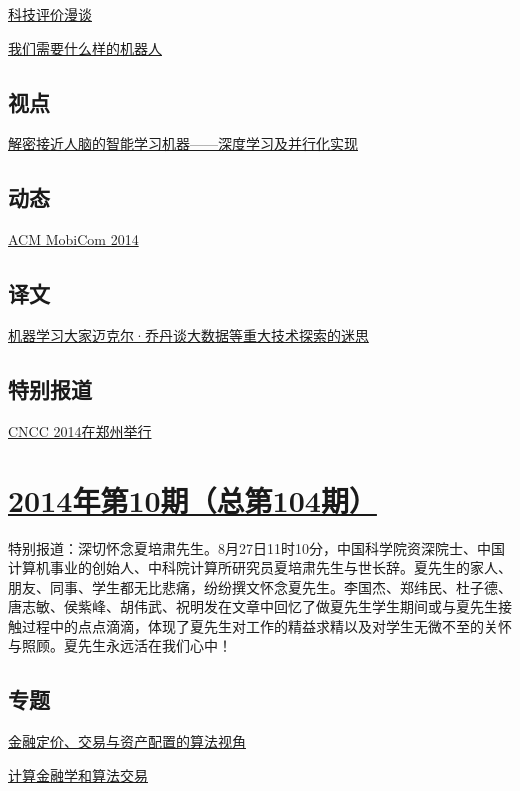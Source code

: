 \documentclass[a4paper]{article}
\begin{document}
\href{http://history.ccf.org.cn/resources/1190201776262/2014/11/13/6.pdf}{科技评价漫谈}

\href{http://history.ccf.org.cn/resources/1190201776262/2014/11/13/8.pdf}{我们需要什么样的机器人}

\subsection{视点}
\href{http://history.ccf.org.cn/resources/1190201776262/2014/11/13/12.pdf}{解密接近人脑的智能学习机器——深度学习及并行化实现}

\subsection{动态}
\href{http://history.ccf.org.cn/resources/1190201776262/2014/11/13/13.pdf}{ACM MobiCom 2014}

\subsection{译文}
\href{http://history.ccf.org.cn/resources/1190201776262/2014/11/13/14.pdf}{机器学习大家迈克尔·乔丹谈大数据等重大技术探索的迷思}

\subsection{特别报道}
\href{http://history.ccf.org.cn/resources/1190201776262/2014/11/13/0.pdf}{CNCC 2014在郑州举行}


\section{\href{http://history.ccf.org.cn/sites/ccf/jsjtbbd.jsp?contentId=2826288041117}{\textbf{2014年第10期（总第104期）}}}
特别报道：深切怀念夏培肃先生。8月27日11时10分，中国科学院资深院士、中国计算机事业的创始人、中科院计算所研究员夏培肃先生与世长辞。夏先生的家人、朋友、同事、学生都无比悲痛，纷纷撰文怀念夏先生。李国杰、郑纬民、杜子德、唐志敏、侯紫峰、胡伟武、祝明发在文章中回忆了做夏先生学生期间或与夏先生接触过程中的点点滴滴，体现了夏先生对工作的精益求精以及对学生无微不至的关怀与照顾。夏先生永远活在我们心中！
\subsection{专题}
\href{http://history.ccf.org.cn/resources/1190201776262/2014/10/13/13.pdf}{金融定价、交易与资产配置的算法视角}

\href{http://history.ccf.org.cn/resources/1190201776262/2014/10/13/8.pdf}{计算金融学和算法交易}
\end{document}
